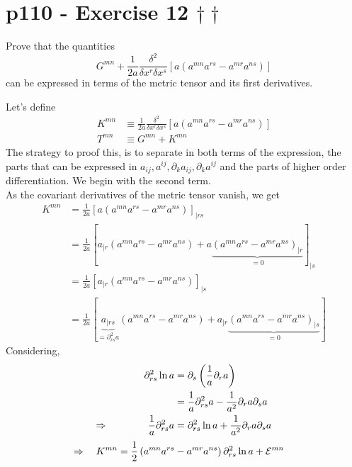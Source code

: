 \section{p110 - Exercise 12 $\dagger  \dagger$}
\begin{tcolorbox}
Prove that the quantities $$G^{mn}+ \frac{1}{2a}\frac{\delta^2}{\delta x^r \delta x^s}\left[ a \left( a^{mn}a^{rs}-a^{mr}a^{ns} \right)\right]$$ can be expressed in terms of the metric tensor and its first derivatives.
\end{tcolorbox}
Let's define 
\begin{align}
K^{mn} &\equiv \frac{1}{2a}\frac{\delta^2}{\delta x^r \delta x^s}\left[ a \left( a^{mn}a^{rs}-a^{mr}a^{ns} \right)\right]\\
T^{mn} &\equiv G^{mn}+ K^{mn}
\end{align}
The strategy to proof this, is to separate in both terms of the expression, the parts that can be expressed in $a_{ij}, a^{ij}, \partial_k a_{ij}, \partial_k a^{ij}$ and the parts of higher order differentiation.
We begin with the second term.\\
As the covariant derivatives of the metric tensor vanish, we get
\begin{align}
K^{mn} &=\frac{1}{2a}\left[ a \left( a^{mn}a^{rs}-a^{mr}a^{ns} \right)\right] _{|rs}\\
&= \frac{1}{2a}\left[ a_{|r} \left( a^{mn}a^{rs}-a^{mr}a^{ns} \right)+ a \underbrace{\left( a^{mn}a^{rs}-a^{mr}a^{ns} \right)_{|r}}_{=0}\right] _{|s}\\
&= \frac{1}{2a}\left[ a_{|r} \left( a^{mn}a^{rs}-a^{mr}a^{ns} \right)\right] _{|s}\\
&= \frac{1}{2a}\left[ \underbrace{a_{|rs}}_{=\partial^2_{rs} a} \left( a^{mn}a^{rs}-a^{mr}a^{ns} \right)+a_{|r} \underbrace{\left( a^{mn}a^{rs}-a^{mr}a^{ns} \right)_{|s}}_{=0} \right]
\end{align}
Considering, 
\begin{align}
\partial^2_{rs} \ln a&= \partial_s \left(\frac{1}{a}\partial_r a\right)\\
&= \frac{1}{a}\partial^2_{rs}a-\frac{1}{a^2}\partial_r a\partial_s a\\
\Rightarrow\quad\quad\quad\quad \frac{1}{a}\partial^2_{rs}a &= \partial^2_{rs} \ln a+ \frac{1}{a^2}\partial_r a\partial_s a
\end{align}
\begin{align}
\Rightarrow \quad K^{mn} &= \frac{1}{2}\left( a^{mn}a^{rs}-a^{mr}a^{ns} \right)\partial^2_{rs}\ln a+\mathcal{E}^{mn} 
\end{align}
